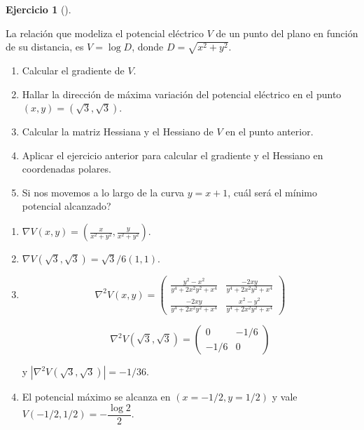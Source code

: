 \documentclass[
  a4paper,
]{scrreport}
\theoremstyle{definition}
\newtheorem{exercise}{Ejercicio}[chapter]
\theoremstyle{remark}
\begin{document}
\begin{exercise}[]\protect\hypertarget{exr-potencial-electrico}{}\label{exr-potencial-electrico}

La relación que modeliza el potencial eléctrico \(V\) de un punto del
plano en función de su distancia, es \(V=\log D\), donde
\(D=\sqrt{x^2+y^2}\).

\begin{enumerate}
\def\labelenumi{\alph{enumi}.}
\item
  Calcular el gradiente de \(V\).
\item
  Hallar la dirección de máxima variación del potencial eléctrico en el
  punto \((x,y)=(\sqrt{3},\sqrt{3})\).
\item
  Calcular la matriz Hessiana y el Hessiano de \(V\) en el punto
  anterior.
\item
  Aplicar el ejercicio anterior para calcular el gradiente y el Hessiano
  en coordenadas polares.
\item
  Si nos movemos a lo largo de la curva \(y=x+1\), cuál será el mínimo
  potencial alcanzado?
\end{enumerate}

\end{exercise}

\begin{tcolorbox}[enhanced jigsaw, toprule=.15mm, bottomrule=.15mm, coltitle=black, toptitle=1mm, breakable, left=2mm, arc=.35mm, title=\textcolor{quarto-callout-tip-color}{\faLightbulb}\hspace{0.5em}{Solución}, titlerule=0mm, colback=white, colbacktitle=quarto-callout-tip-color!10!white, colframe=quarto-callout-tip-color-frame, bottomtitle=1mm, rightrule=.15mm, leftrule=.75mm, opacitybacktitle=0.6, opacityback=0]

\begin{enumerate}
\def\labelenumi{\alph{enumi}.}
\item
  \(\nabla V(x,y) = \left( \frac{x}{x^2+y^2},\frac{y}{x^2+y^2}\right)\).
\item
  \(\nabla V(\sqrt 3, \sqrt 3) = \sqrt 3 /6(1,1)\).
\item
  \[
  \nabla^2V(x,y) = \left(
  \begin{array}{cc}
  \frac{y^2-x^2}{y^4+2x^2y^2+x^4} & \frac{-2xy}{y^4+2x^2y^2+x^4} \\
  \frac{-2xy}{y^4+2x^2y^2+x^4} & \frac{x^2-y^2}{y^4+2x^2y^2+x^4}
  \end{array}
  \right)
  \]

  \[
  \nabla^2V(\sqrt{3},\sqrt{3}) = 
  \left(
  \begin{array}{cc}
  0 & -1/6 \\
  -1/6 & 0
  \end{array}
  \right)
  \]

  y \(|\nabla^2V(\sqrt 3,\sqrt 3)| = -1/36.\)
\item
  El potencial máximo se alcanza en \((x=-1/2, y=1/2)\) y vale
  \(V(-1/2,1/2) = -\dfrac{\log 2}{2}\).
\end{enumerate}

\end{tcolorbox}
\end{document}
